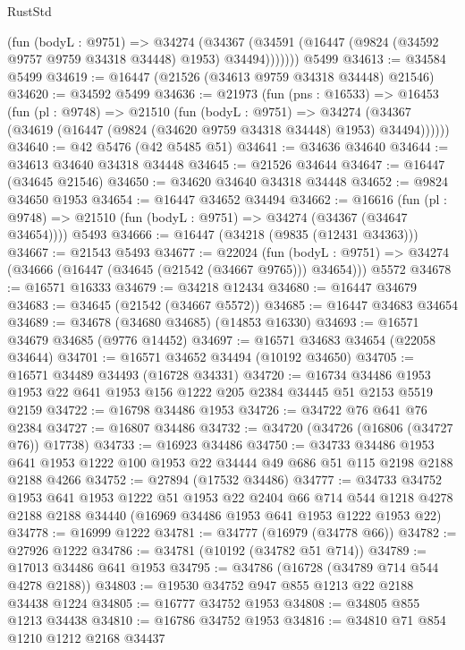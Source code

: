 \begin{lexlean}{RustStd}
\begin{coremodule}
          (fun (bodyL : @9751) =>
          @34274
            (@34367 (@34591 (@16447 (@9824 (@34592 @9757 @9759 @34318 @34448) @1953) @34494)))))))
    @5499
@34613 := @34584 @5499
@34619 := @16447 (@21526 (@34613 @9759 @34318 @34448) @21546)
@34620 := @34592 @5499
@34636 := @21973
    (fun (pns : @16533) =>
    @16453
      (fun (pl : @9748) =>
      @21510
        (fun (bodyL : @9751) =>
        @34274 (@34367 (@34619 (@16447 (@9824 (@34620 @9759 @34318 @34448) @1953) @34494))))))
@34640 := @42 @5476 (@42 @5485 @51)
@34641 := @34636 @34640
@34644 := @34613 @34640 @34318 @34448
@34645 := @21526 @34644
@34647 := @16447 (@34645 @21546)
@34650 := @34620 @34640 @34318 @34448
@34652 := @9824 @34650 @1953
@34654 := @16447 @34652 @34494
@34662 := @16616
    (fun (pl : @9748) => @21510 (fun (bodyL : @9751) => @34274 (@34367 (@34647 @34654))))
    @5493
@34666 := @16447 (@34218 (@9835 (@12431 @34363)))
@34667 := @21543 @5493
@34677 := @22024
    (fun (bodyL : @9751) => @34274 (@34666 (@16447 (@34645 (@21542 (@34667 @9765))) @34654)))
    @5572
@34678 := @16571 @16333
@34679 := @34218 @12434
@34680 := @16447 @34679
@34683 := @34645 (@21542 (@34667 @5572))
@34685 := @16447 @34683 @34654
@34689 := @34678 (@34680 @34685) (@14853 @16330)
@34693 := @16571 @34679 @34685 (@9776 @14452)
@34697 := @16571 @34683 @34654 (@22058 @34644)
@34701 := @16571 @34652 @34494 (@10192 @34650)
@34705 := @16571 @34489 @34493 (@16728 @34331)
@34720 := @16734
    @34486
    @1953
    @1953
    @22
    @641
    @1953
    @156
    @1222
    @205
    @2384
    @34445
    @51
    @2153
    @5519
    @2159
@34722 := @16798 @34486 @1953
@34726 := @34722 @76 @641 @76 @2384
@34727 := @16807 @34486
@34732 := @34720 (@34726 (@16806 (@34727 @76)) @17738)
@34733 := @16923 @34486
@34750 := @34733
    @34486
    @1953
    @641
    @1953
    @1222
    @100
    @1953
    @22
    @34444
    @49
    @686
    @51
    @115
    @2198
    @2188
    @2188
    @4266
@34752 := @27894 (@17532 @34486)
@34777 := @34733
    @34752
    @1953
    @641
    @1953
    @1222
    @51
    @1953
    @22
    @2404
    @66
    @714
    @544
    @1218
    @4278
    @2188
    @2188
    @34440
    (@16969 @34486 @1953 @641 @1953 @1222 @1953 @22)
@34778 := @16999 @1222
@34781 := @34777 (@16979 (@34778 @66))
@34782 := @27926 @1222
@34786 := @34781 (@10192 (@34782 @51 @714))
@34789 := @17013 @34486 @641 @1953
@34795 := @34786 (@16728 (@34789 @714 @544 @4278 @2188))
@34803 := @19530 @34752 @947 @855 @1213 @22 @2188 @34438 @1224
@34805 := @16777 @34752 @1953
@34808 := @34805 @855 @1213 @34438
@34810 := @16786 @34752 @1953
@34816 := @34810 @71 @854 @1210 @1212 @2168 @34437

\end{coremodule}
\end{lexlean}
